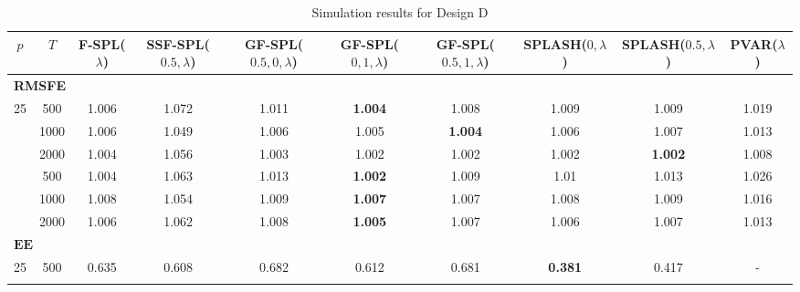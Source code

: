 \begin{landscape}
    \bgroup
    \def\arraystretch{1.3}
    \begin{table}[p]
    \small
    \centering
    \caption{Simulation results for Design D}
    \label{tab:results_designD}
    \begin{tabular}{cccccccccc}    
    \hline \hline
    $p$  &  $T$   &  F-SPL($\lambda$)  & SSF-SPL($0.5, \lambda$)  &  GF-SPL($0.5, 0, \lambda$)  &  GF-SPL($0, 1, \lambda$)  &  GF-SPL($0.5, 1, \lambda$)  &  SPLASH($0, \lambda$)  &  SPLASH($0.5, \lambda$)  &  PVAR($\lambda$)  \\
    \hline
    \multicolumn{10}{l}{\textbf{RMSFE}} \\
	\hline
	 25  & 500  &       1.006        &           1.072           &            1.011            & \textbf{1.004}            & 1.008                       &         1.009          & 1.009                    &       1.019       \\ \hdashline
	 25  & 1000 &       1.006        &           1.049           &            1.006            & 1.005                     & \textbf{1.004}              &         1.006          & 1.007                    &       1.013       \\ \hdashline
	 25  & 2000 &       1.004        &           1.056           &            1.003            & 1.002                     & 1.002                       &         1.002          & \textbf{1.002}           &       1.008       \\ \hdashline
	 36  & 500  &       1.004        &           1.063           &            1.013            & \textbf{1.002}            & 1.009                       &          1.01          & 1.013                    &       1.026       \\ \hdashline
	 36  & 1000 &       1.008        &           1.054           &            1.009            & \textbf{1.007}            & 1.007                       &         1.008          & 1.009                    &       1.016       \\ \hdashline
	 36  & 2000 &       1.006        &           1.062           &            1.008            & \textbf{1.005}            & 1.007                       &         1.006          & 1.007                    &       1.013       \\
	\hline
	\multicolumn{10}{l}{$\mathbf{EE}$} \\
	\hline
	 25  & 500  &       0.635        &           0.608           &            0.682            &           0.612           &            0.681            & \textbf{0.381}         &          0.417           & -                 \\ \hdashline

\end{tabular}
\end{table}
\end{landscape}
